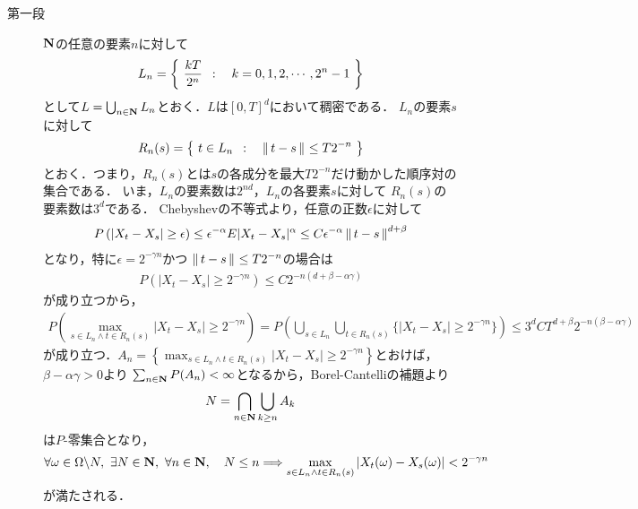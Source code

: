 	\begin{prf}\mbox{}
		\begin{description}
			\item[第一段]
				$\mathbf{N}$の任意の要素$n$に対して
				\begin{align}
					L_n = \left\{\ \frac{kT}{2^n}\ \, : \quad k=0,1,2,\cdots,2^n-1\ \right\}
				\end{align}
				として$L = \bigcup_{n \in \mathbf{N}} L_n$とおく．$L$は$[0,T]^d$において稠密である．
				$L_n$の要素$s$に対して
				\begin{align}
					R_n(s) = \left\{\ t \in L_n\ \, : \quad \left\|\, t-s\, \right\|_{} \leq T2^{-n}\ \right\}
				\end{align}
				とおく．つまり，$R_n(s)$とは$s$の各成分を最大$T2^{-n}$だけ動かした順序対の集合である．
				いま，$L_n$の要素数は$2^{nd}$，$L_n$の各要素$s$に対して
				$R_n(s)$の要素数は$3^d$である．
				Chebyshevの不等式より，任意の正数$\epsilon$に対して
				\begin{align}
					P\left(|X_t-X_s|\geq\epsilon\right)
					\leq \epsilon^{-\alpha}E|X_t-X_s|^\alpha
					\leq C\epsilon^{-\alpha}\left\|\, t-s\, \right\|_{}^{d+\beta}
				\end{align}
				となり，特に$\epsilon = 2^{-\gamma n}$かつ
				$\left\|\, t-s\, \right\|_{} \leq T2^{-n}$の場合は
				\begin{align}
					P\left(|X_t-X_s|\geq2^{-\gamma n}\right)
					\leq C 2^{-n(d+\beta - \alpha \gamma)}
				\end{align}
				が成り立つから，
				\begin{align}
					P\left(\operatorname*{max}_{s \in L_n \wedge t \in R_n(s)}
					|X_t-X_s|\geq2^{-\gamma n}\right)
					= P\left(\bigcup_{s \in L_n} \bigcup_{t \in R_n(s)}
					\{|X_t-X_s|\geq2^{-\gamma n}\}\right)
					\leq 3^d C T^{d+\beta} 2^{-n(\beta - \alpha \gamma)}
				\end{align}
				が成り立つ．$A_n = \left\{\operatorname*{max}_{s \in L_n \wedge t \in R_n(s)}|X_t-X_s|\geq2^{-\gamma n}\right\}$とおけば，$\beta - \alpha \gamma > 0$より
				$\sum_{n \in \mathbf{N}}P(A_n) < \infty$となるから，Borel-Cantelliの補題より
				\begin{align}
					N = \bigcap_{n \in \mathbf{N}} \bigcup_{k \geq n} A_k
				\end{align}
				は$P$-零集合となり，
				\begin{align}
					\forall \omega \in \Omega \backslash N,\
					\exists N \in \mathbf{N},\
					\forall n \in \mathbf{N},\quad
					N \leq n \Longrightarrow \operatorname*{max}_{s \in L_n \wedge t \in R_n(s)}
					|X_t(\omega) - X_s(\omega)| < 2^{-\gamma n}
					\label{eq:chapter_2_theorem_2_8_1}
				\end{align}
				が満たされる．
				

\end{description}
\end{prf}

